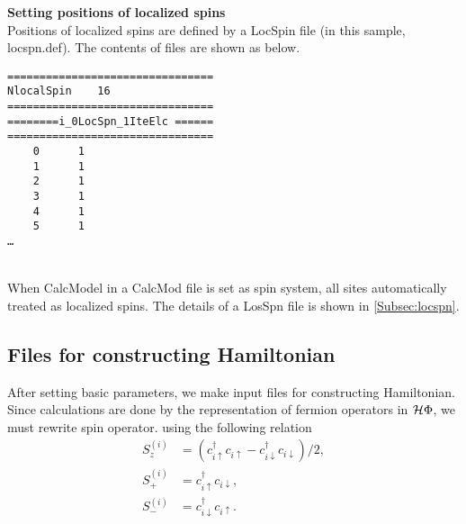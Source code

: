 \begin{description}
\item {\bf Setting positions of localized spins}\\
Positions  of localized spins are defined by a LocSpin file (in this sample, locspn.def). The contents of files are shown as below.\\
\begin{minipage}{15cm}
\begin{screen}
\begin{verbatim}
================================ 
NlocalSpin    16  
================================ 
========i_0LocSpn_1IteElc ====== 
================================ 
    0      1
    1      1
    2      1
    3      1
    4      1
    5      1
…
\end{verbatim}
\end{screen}
\end{minipage}
~\\
When CalcModel in a CalcMod file is set as spin system, all sites automatically treated as localized spins. The details of a LosSpn file is shown in \ref{Subsec:locspn}.
\end{description}

\subsection{Files for constructing Hamiltonian}
After setting basic parameters, we make input files for constructing Hamiltonian. Since calculations are done by the representation of fermion operators in $\mathcal{H} \Phi$, we must rewrite spin operator.  using the following relation
\begin{align}
S_z^{(i)}&=(c_{i\uparrow}^{\dag}c_{i\uparrow}-c_{i\downarrow}^{\dag}c_{i\downarrow})/2,\\
S_+^{(i)}&=c_{i\uparrow}^{\dag}c_{i\downarrow},\\
S_-^{(i)}&=c_{i\downarrow}^{\dag}c_{i\uparrow}.
\end{align}

